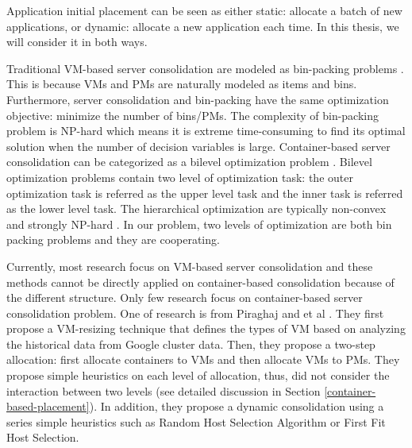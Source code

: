 Application initial placement can be seen as either static: allocate a batch of new applications, or dynamic: allocate a new application each time. In this thesis, we will consider it in both ways.

Traditional VM-based server consolidation are modeled as bin-packing problems \cite{Mann:2015ua}. This is because VMs and PMs are naturally modeled as items and bins. Furthermore, server consolidation and bin-packing have the same optimization objective: minimize the number of bins/PMs. The complexity of bin-packing problem is NP-hard which means it is extreme time-consuming to find its optimal solution when the number of decision variables is large. Container-based server consolidation can be categorized as a bilevel optimization problem \cite{Colson:2007bu}. Bilevel optimization problems contain two level of optimization task: the outer optimization task is referred as the upper level task and the inner task is referred as the lower level task. The hierarchical optimization are typically non-convex and strongly NP-hard \cite{Vicente:1994ie}. In our problem, two levels of optimization are both bin packing problems and they are cooperating.

Currently, most research focus on VM-based server consolidation and these methods cannot be directly applied on container-based consolidation because of the different structure. Only few research focus on container-based server consolidation problem. One of  research is from Piraghaj and et al \cite{Piraghaj:2015uf}. They first propose a VM-resizing technique that defines the types of VM based on analyzing the historical data from Google cluster data. Then, they propose a two-step allocation: first allocate containers to VMs and then allocate VMs to PMs. They propose simple heuristics on each level of allocation, thus, did not consider the interaction between two levels (see detailed discussion in Section \ref{container-based-placement}). In addition, they propose a dynamic consolidation \cite{Piraghaj:2016bw} using a series simple heuristics such as Random Host Selection Algorithm or First Fit Host Selection. 


